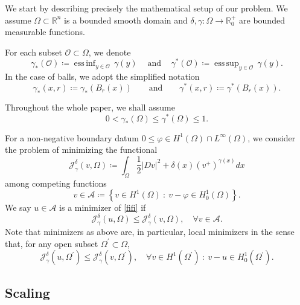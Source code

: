 \documentclass[reqno,11pt]{amsart}
\DeclareMathOperator*{\ess}{ess\,}
\newcommand{\R}{\mathbb R}
\newcommand{\1}{\mathds{1}}
\numberwithin{equation}{section}
\begin{document}
We start by describing precisely the mathematical setup of our problem. We assume $\Omega \subset \mathbb{R}^n$ is a bounded smooth domain and $\delta, \gamma \colon \Omega \to \R_0^+$ are bounded measurable functions. 

For each subset $\mathcal{O} \subset \Omega$, we denote
\begin{equation}\label{home}
\gamma_\ast (\mathcal{O}) \coloneqq  \mathop{\ess \inf}_{y\in \mathcal{O}} \, \gamma (y) \ \quad \text{and} \quad \, \gamma^\ast (\mathcal{O}) \coloneqq  \mathop{\ess \sup}_{y \in \mathcal{O}} \, \gamma (y).  
\end{equation}
In the case of balls, we adopt the simplified notation
\begin{equation*}
    \gamma_\ast (x,r) \coloneqq \gamma_\ast (B_r(x)) \qquad \text{and} \qquad \gamma^\ast(x,r) \coloneqq \gamma^\ast (B_r(x)).
\end{equation*}


Throughout the whole paper, we shall assume
\begin{equation} \label{H1}
0<\gamma_\ast(\Omega)   \le  \gamma^\ast(\Omega)  \le 1.
\end{equation}

For a non-negative boundary datum $0 \leq \varphi \in H^1(\Omega) \cap L^\infty(\Omega)$, we consider the problem of minimizing the functional 
\begin{equation}\label{fifi}
	\mathcal{J}^\delta_\gamma(v, \Omega) \coloneqq  \int_{\Omega} \frac{1}{2} \left| Dv \right|^2 + \delta(x) (v^+)^{\gamma(x)} dx
\end{equation}
among competing functions 
$$
v \in {\mathcal A} \coloneqq  \left\{ v \in H^1(\Omega) \ :\ v-\varphi \in H_0^1(\Omega) \right\}. 
$$
We say $u \in \mathcal{A}$ is a minimizer of \eqref{fifi} if 
$$
\mathcal{J}^\delta_\gamma(u, \Omega) \leq \mathcal{J}^\delta_\gamma(v, \Omega), \quad \forall v \in \mathcal{A}. 
$$
Note that minimizers as above are, in particular, local minimizers in the sense that, for any open subset $\Omega^\prime \subset \Omega$,
$$
\mathcal{J}^\delta_\gamma(u, \Omega^\prime) \leq \mathcal{J}^\delta_\gamma(v, \Omega^\prime), \quad \forall v \in H^1(\Omega^\prime)\ :\ v-u \in H_0^1(\Omega^\prime).
$$

\subsection{Scaling}
\end{document}
